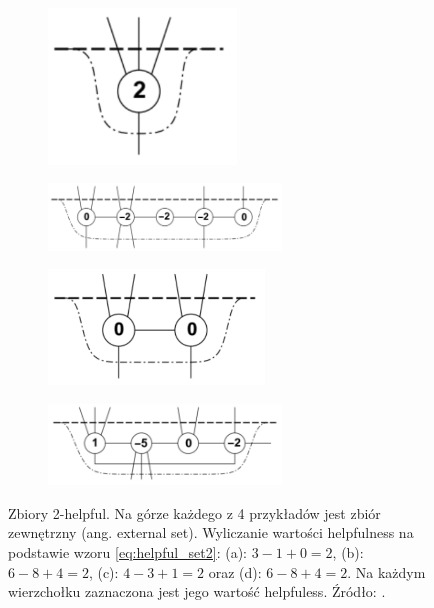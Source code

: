 \begin{figure}[h]
\centering
\begin{subfigure}{.3\textwidth}
    \centering
    \includegraphics[width=0.55\textwidth]{images/helpfulsets/1}
    \caption[short]{}
\end{subfigure}
\begin{subfigure}{.69\textwidth}
    \centering
    \includegraphics[width=0.68\textwidth]{images/helpfulsets/2}
    \caption[short]{}
\end{subfigure}%

\begin{subfigure}{.4\textwidth}
    \centering
    \includegraphics[width=0.63\textwidth]{images/helpfulsets/3}
    \caption[short]{}
\end{subfigure}
\begin{subfigure}{.59\textwidth}
    \centering
    \includegraphics[width=0.68\textwidth]{images/helpfulsets/4}
    \caption[short]{}
\end{subfigure}
\caption{Zbiory 2-helpful. Na górze każdego z 4 przykładów jest zbiór zewnętrzny (ang. external set). Wyliczanie wartości
helpfulness na podstawie wzoru \ref{eq:helpful_set2}: (a): $3-1+0=2$, (b): $6-8+4=2$, (c): $4-3+1=2$ oraz (d): $6-8+4=2$.
Na każdym wierzchołku zaznaczona jest jego wartość helpfuless.
Źródło: \cite{article}.}
\label{im:helpfulsets:example}
\end{figure}

